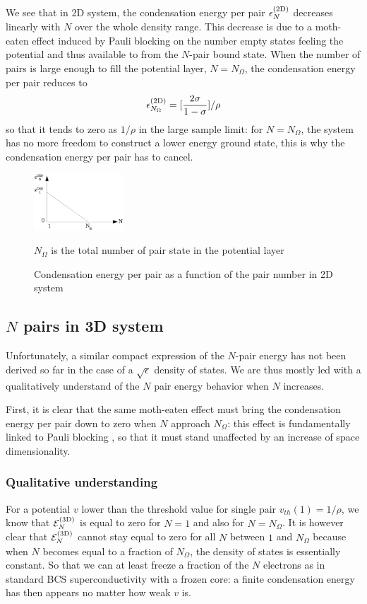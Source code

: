 \documentclass[aps,prb,showpacs,reprint]{revtex4-1}
\begin{document}
We see that in 2D system, the condensation energy per pair $\epsilon^{{\text{(2D)}}}_N$  decreases linearly with $N$ over the whole density range. This decrease is due to a moth-eaten effect induced by Pauli blocking on the number empty states feeling the potential and thus available to from the $N$-pair bound state.  When the number of pairs is large enough to fill the potential layer, $N=N_\Omega$, the condensation energy per pair reduces to 
\begin{equation}
 \epsilon^{{\text{(2D)}}}_{N_\Omega}=[\frac{2\sigma}{1-\sigma}]/\rho
\end{equation}
so that it tends to zero as $1/\rho$ in the large sample limit: for $N=N_\Omega$, the system has no more freedom to construct a lower energy ground state, this is why the condensation energy per pair has to cancel.  


\begin{figure}[htbp]
	\centering
		\includegraphics[width=0.30\textwidth]{2dCondEnergy.eps}
	\caption{Condensation energy per pair as a function of the pair number in 2D system}
	$N_{\Omega}$ is the total number of pair state in the potential layer
	\label{fig:2dCondEnergy}
\end{figure}



\subsection{$N$ pairs in 3D system}
Unfortunately, a similar compact expression of the $N$-pair energy has not been derived so far in the case of a $\sqrt{\epsilon}$ density of states. We are thus mostly led with a qualitatively understand of the $N$ pair energy  behavior when $N$ increases. 

First, it is clear that the same moth-eaten effect must bring the condensation energy per pair down to zero when $N$ approach $N_\Omega$: this effect is fundamentally linked to  Pauli blocking , so that it must stand unaffected by an increase of space dimensionality. 

\subsubsection{Qualitative understanding}
For a potential $v$ lower than the threshold value for single pair $v_{th}(1)=1/\rho$, we know that $\mathcal{E}_N^{{\text{(3D)}}}$ is equal to zero for $N=1$ and also for $N=N_\Omega$.  It is however clear that $\mathcal{E}_N^{{\text{(3D)}}}$ cannot stay equal to zero for all $N$ between $1$ and $N_\Omega$ because when $N$ becomes equal to a fraction of $N_\Omega$, the density of states is essentially constant.  So that we can at least freeze a fraction of the $N$ electrons as in standard BCS superconductivity with a frozen core: a finite condensation energy has then appears no matter how weak $v$ is. 
\end{document}
